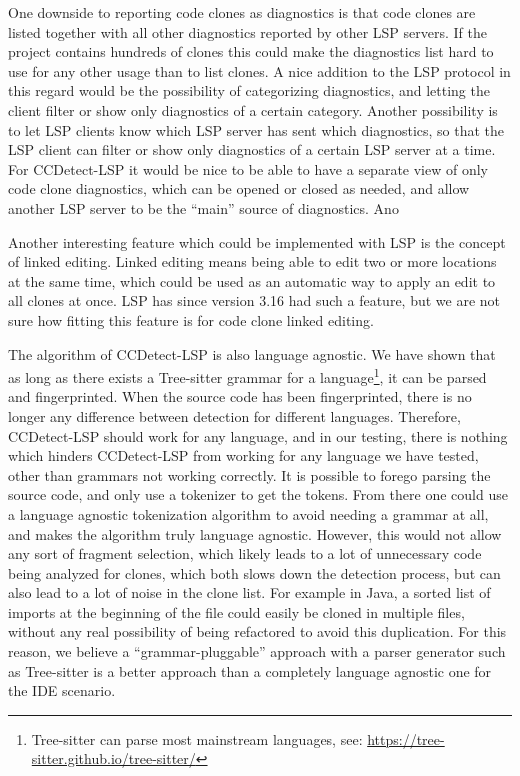 One downside to reporting code clones as diagnostics is that code clones are listed
together with all other diagnostics reported by other LSP servers. If the project contains
hundreds of clones this could make the diagnostics list hard to use for any other usage
than to list clones. A nice addition to the LSP protocol in this regard would be the
possibility of categorizing diagnostics, and letting the client filter or show only
diagnostics of a certain category. Another possibility is to let LSP clients know which
LSP server has sent which diagnostics, so that the LSP client can filter or show only
diagnostics of a certain LSP server at a time. For CCDetect-LSP it would be nice to be
able to have a separate view of only code clone diagnostics, which can be opened or closed
as needed, and allow another LSP server to be the ``main'' source of diagnostics. Ano

Another interesting feature which could be implemented with LSP is the concept of linked
editing. Linked editing means being able to edit two or more locations at the same time,
which could be used as an automatic way to apply an edit to all clones at once. LSP has
since version 3.16 had such a feature, but we are not sure how fitting this feature is for
code clone linked editing.

The algorithm of CCDetect-LSP is also language agnostic. We have shown that as long as
there exists a Tree-sitter grammar for a language\footnote{Tree-sitter can parse most
mainstream languages, see: \url{https://tree-sitter.github.io/tree-sitter/}}, it can be
parsed and fingerprinted. When the source code has been fingerprinted, there is no longer
any difference between detection for different languages. Therefore, CCDetect-LSP should
work for any language, and in our testing, there is nothing which hinders CCDetect-LSP
from working for any language we have tested, other than grammars not working correctly.
It is possible to forego parsing the source code, and only use a tokenizer to get the
tokens. From there one could use a language agnostic tokenization algorithm to avoid
needing a grammar at all, and makes the algorithm truly language agnostic. However, this
would not allow any sort of fragment selection, which likely leads to a lot of unnecessary
code being analyzed for clones, which both slows down the detection process, but can also
lead to a lot of noise in the clone list. For example in Java, a sorted list of imports at
the beginning of the file could easily be cloned in multiple files, without any real
possibility of being refactored to avoid this duplication. For this reason, we believe a
``grammar-pluggable'' approach with a parser generator such as Tree-sitter is a better
approach than a completely language agnostic one for the IDE scenario.
